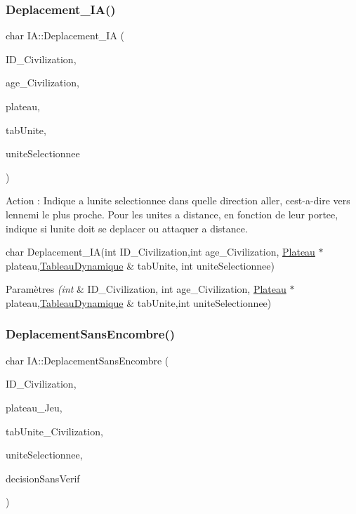 \subsubsection{\texorpdfstring{Deplacement\+\_\+\+I\+A()}{Deplacement\_IA()}}
{\footnotesize\ttfamily char I\+A\+::\+Deplacement\+\_\+\+IA (\begin{DoxyParamCaption}\item[{int}]{I\+D\+\_\+\+Civilization,  }\item[{int}]{age\+\_\+\+Civilization,  }\item[{\hyperlink{classPlateau}{Plateau} $\ast$}]{plateau,  }\item[{\hyperlink{classTableauDynamique}{Tableau\+Dynamique} \&}]{tab\+Unite,  }\item[{int}]{unite\+Selectionnee }\end{DoxyParamCaption})}



Action \+: Indique a l\textquotesingle{}unite selectionnee dans quelle direction aller, c\textquotesingle{}est-\/a-\/dire vers l\textquotesingle{}ennemi le plus proche. Pour les unites a distance, en fonction de leur portee, indique si l\textquotesingle{}unite doit se deplacer ou attaquer a distance. 

char Deplacement\+\_\+\+IA(int I\+D\+\_\+\+Civilization,int age\+\_\+\+Civilization, \hyperlink{classPlateau}{Plateau} $\ast$ plateau,\hyperlink{classTableauDynamique}{Tableau\+Dynamique} \& tab\+Unite, int unite\+Selectionnee) 
\begin{DoxyParams}{Paramètres}
{\em (int} & I\+D\+\_\+\+Civilization, int age\+\_\+\+Civilization, \hyperlink{classPlateau}{Plateau} $\ast$ plateau,\hyperlink{classTableauDynamique}{Tableau\+Dynamique} \& tab\+Unite,int unite\+Selectionnee) \\
\hline
\end{DoxyParams}
\mbox{\label{classIA_a8b6cc7f5e530f40def7f0490d5a29db7}} 
\subsubsection{\texorpdfstring{Deplacement\+Sans\+Encombre()}{DeplacementSansEncombre()}}
{\footnotesize\ttfamily char I\+A\+::\+Deplacement\+Sans\+Encombre (\begin{DoxyParamCaption}\item[{int}]{I\+D\+\_\+\+Civilization,  }\item[{\hyperlink{classPlateau}{Plateau} $\ast$}]{plateau\+\_\+\+Jeu,  }\item[{\hyperlink{classTableauDynamique}{Tableau\+Dynamique} \&}]{tab\+Unite\+\_\+\+Civilization,  }\item[{int}]{unite\+Selectionnee,  }\item[{char}]{decision\+Sans\+Verif }\end{DoxyParamCaption})}



